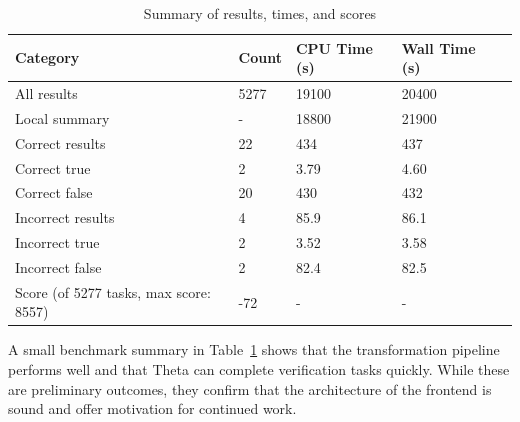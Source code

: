 \begin{table}[]
\centering
\begin{tabular}{@{}lllll@{}}
\toprule
Category                     & Count & CPU Time (s) & Wall Time (s) \\ \midrule
All results                           & 5277  & 19100        & 20400         \\
Local summary                         & -     & 18800        & 21900         \\
\quad Correct results                      & 22    & 434          & 437           \\
\quad\quad Correct true                     & 2     & 3.79         & 4.60          \\
\quad\quad Correct false                    & 20    & 430          & 432           \\
\quad Incorrect results                    & 4     & 85.9         & 86.1          \\
\quad\quad Incorrect true                   & 2     & 3.52         & 3.58          \\
\quad\quad Incorrect false                  & 2     & 82.4         & 82.5          \\
Score (of 5277 tasks, max score: 8557)  & -72   & -            & -             \\ \bottomrule
\end{tabular}
\caption{ Summary of results, times, and scores }
\label{table:summary}
\end{table}

A small benchmark summary in Table~\ref{table:summary} shows that the transformation pipeline performs well and that Theta can complete verification tasks quickly. While these are preliminary outcomes, they confirm that the architecture of the frontend is sound and offer motivation for continued work.


